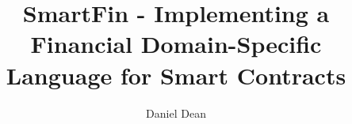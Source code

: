 \documentclass[a4paper, twoside]{report}
\title{SmartFin - Implementing a Financial Domain-Specific Language for Smart Contracts}
\author{Daniel Dean}
\begin{document}


\shipout\null



\shipout\null



\doublespacing
\tableofcontents
\singlespacing



% 










\end{document}
